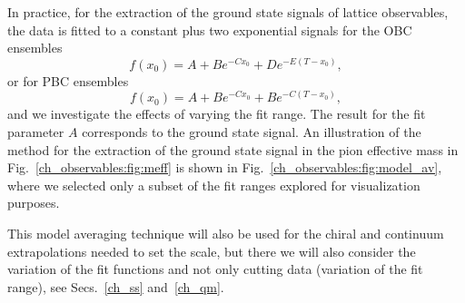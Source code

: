 In practice, for the extraction of the ground state signals of lattice observables, the data is fitted to a constant plus two exponential signals for the OBC ensembles
\begin{equation}
\label{ch_observables:eq:fit}
f(x_0)=A+Be^{-Cx_0}+De^{-E(T-x_0)},
\end{equation}
or for PBC ensembles
\begin{equation}
f(x_0)=A+Be^{-Cx_0}+Be^{-C(T-x_0)},
\end{equation}
and we investigate the effects of varying the fit range. The result for the fit parameter $A$ corresponds to the ground state signal. An illustration of the method for the extraction of the ground state signal in the pion effective mass in Fig.~\ref{ch_observables:fig:meff} is shown in Fig.~\ref{ch_observables:fig:model_av}, where we selected only a subset of the fit ranges explored for visualization purposes.

This model averaging technique will also be used for the chiral and continuum extrapolations needed to set the scale, but there we will also consider the variation of the fit functions and not only cutting data (variation of the fit range), see Secs.~\ref{ch_ss} and~\ref{ch_qm}.

